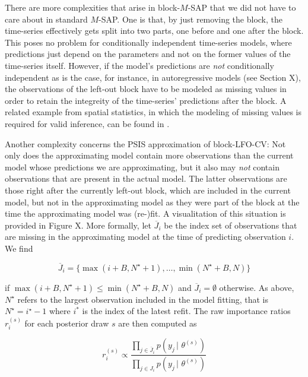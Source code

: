 \documentclass[american,]{article}
\begin{document}
There are more complexities that arise in block-\(M\)-SAP that we did
not have to care about in standard \(M\)-SAP. One is that, by just
removing the block, the time-series effectively gets split into two
parts, one before and one after the block. This poses no problem for
conditionally independent time-series models, where predictions just
depend on the parameters and not on the former values of the time-series
itself. However, if the model's predictions are \emph{not} conditionally
independent as is the case, for instance, in autoregressive models (see
Section X), the observations of the left-out block have to be modeled as
missing values in order to retain the integreity of the time-series'
predictions after the block. A related example from spatial statistics,
in which the modeling of missing values is required for valid inference,
can be found in \citet{buerkner:non-factorizable}.

Another complexity concerns the PSIS approximation of block-LFO-CV: Not
only does the approximating model contain more observations than the
current model whose predictions we are approximating, but it also may
\emph{not} contain observations that are present in the actual model.
The latter observations are those right after the currently left-out
block, which are included in the current model, but not in the
approximating model as they were part of the block at the time the
approximating model was (re-)fit. A visualitation of this situation is
provided in Figure X. More formally, let \(\overline{J}_i\) be the index
set of observations that are missing in the approximating model at the
time of predicting observation \(i\). We find

\begin{equation}
\overline{J}_i = \{ \max(i + B, N^\star + 1), \ldots, \min(N^\star + B, N) \}
\end{equation}

if \(\max(i + B, N^\star + 1) \leq \min(N^\star + B, N)\) and
\(\overline{J}_i = \emptyset\) otherwise. As above, \(N^\star\) refers
to the largest observation included in the model fitting, that is
\(N^\star = i^\star - 1\) where \(i^*\) is the index of the latest
refit. The raw importance ratios \(r_i^{(s)}\) for each posterior draw
\(s\) are then computed as

\begin{equation}
r_i^{(s)} \propto \frac{\prod_{j \in \overline{J}_i} p(y_j \,|\, \,\theta^{(s)})}
{\prod_{j \in J_i} p(y_j \,|\, \,\theta^{(s)})}
\end{equation}
\end{document}
